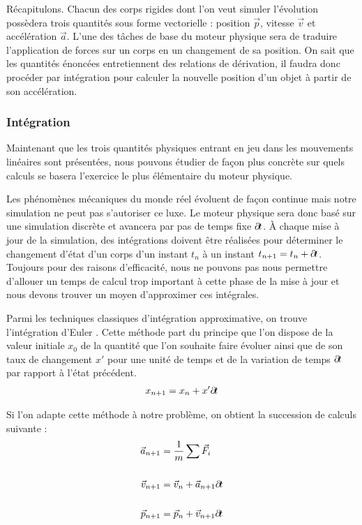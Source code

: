 Récapitulons. Chacun des corps rigides dont l'on veut simuler
l'évolution possèdera trois quantités sous forme vectorielle :
position $\vec p$, vitesse $\vec v$ et accélération $\vec a$. L'une
des tâches de base du moteur physique sera de traduire l'application
de forces sur un corps en un changement de sa position. On sait que
les quantités énoncées entretiennent des relations de dérivation, il
faudra donc procéder par intégration pour calculer la nouvelle
position d'un objet à partir de son accélération.

\subsubsection{Intégration}

Maintenant que les trois quantités physiques entrant en jeu dans les
mouvements linéaires sont présentées, nous pouvons étudier de façon
plus concrète sur quels calculs se basera l'exercice le plus
élémentaire du moteur physique.

Les phénomènes mécaniques du monde réel évoluent de façon continue
mais notre simulation ne peut pas s'autoriser ce luxe. Le moteur
physique sera donc basé sur une simulation discrète et avancera par pas
de temps fixe $\partial \! t$. \`A chaque mise à jour de la simulation, des
intégrations doivent être réalisées pour déterminer le changement
d'état d'un corps d'un instant $t_n$ à un instant $t_{n+1} = t_n +
\partial \! t$. Toujours pour des raisons d'efficacité, nous ne pouvons pas
nous permettre d'allouer un temps de calcul trop important à cette
phase de la mise à jour et nous devons trouver un moyen d'approximer
ces intégrales.

Parmi les techniques classiques d'intégration approximative, on trouve
l'intégration d'Euler \cite{hecker}. Cette méthode part du principe
que l'on dispose de la valeur initiale $x_0$ de la quantité que l'on
souhaite faire évoluer ainsi que de son taux de changement $x'$ pour
une unité de temps et de la variation de temps $\partial \! t$ par rapport
à l'état précédent.
\begin{align*}
  x_{n+1} = x_{n} + x' \partial \! t
\end{align*}

Si l'on adapte cette méthode à notre problème, on obtient la
succession de calculs suivante :
\begin{align*}
  \vec{a}_{n+1} &= \frac{1}{m} \sum \vec{F}_i \\ \\
  \vec{v}_{n+1} &= \vec{v}_n + \vec{a}_{n+1} \partial \! t \\ \\
  \vec{p}_{n+1} &= \vec{p}_n + \vec{v}_{n+1} \partial \! t
\end{align*}

